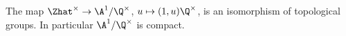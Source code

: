 The map $\Zhat^\times\to\A^1/\Q^\times$, $u\mapsto(1,u)\Q^\times$, is an isomorphism of topological groups. In
particular $\A^1/\Q^\times$ is compact.
